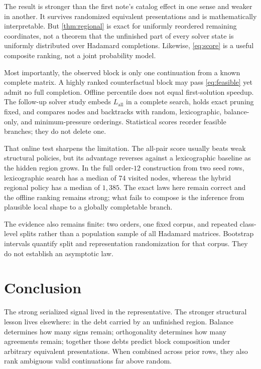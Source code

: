 \documentclass[10pt,twoside]{article}
\theoremstyle{noteplain}
\theoremstyle{definition}
\begin{document}
The result is stronger than the first note's catalog effect in one sense and weaker in another.  It survives randomized equivalent presentations and is mathematically interpretable.  But \cref{thm:regional} is exact for uniformly reordered remaining coordinates, not a theorem that the unfinished part of every solver state is uniformly distributed over Hadamard completions.  Likewise, \eqref{eq:score} is a useful composite ranking, not a joint probability model.

Most importantly, the observed block is only one continuation from a known complete matrix.  A highly ranked counterfactual block may pass \eqref{eq:feasible} yet admit no full completion.  Offline percentile does not equal first-solution speedup.  The follow-up solver study embeds $L_{\mathrm{all}}$ in a complete search, holds exact pruning fixed, and compares nodes and backtracks with random, lexicographic, balance-only, and minimum-pressure orderings.  Statistical scores reorder feasible branches; they do not delete one.

That online test sharpens the limitation.  The all-pair score usually beats weak structural policies, but its advantage reverses against a lexicographic baseline as the hidden region grows.  In the full order-$12$ construction from two seed rows, lexicographic search has a median of $74$ visited nodes, whereas the hybrid regional policy has a median of $1{,}385$.  The exact laws here remain correct and the offline ranking remains strong; what fails to compose is the inference from plausible local shape to a globally completable branch.

The evidence also remains finite: two orders, one fixed corpus, and repeated class-level splits rather than a population sample of all Hadamard matrices.  Bootstrap intervals quantify split and representation randomization for that corpus.  They do not establish an asymptotic law.

\section{Conclusion}

The strong serialized signal lived in the representative.  The stronger structural lesson lives elsewhere: in the debt carried by an unfinished region.  Balance determines how many signs remain; orthogonality determines how many agreements remain; together those debts predict block composition under arbitrary equivalent presentations.  When combined across prior rows, they also rank ambiguous valid continuations far above random.
\end{document}
